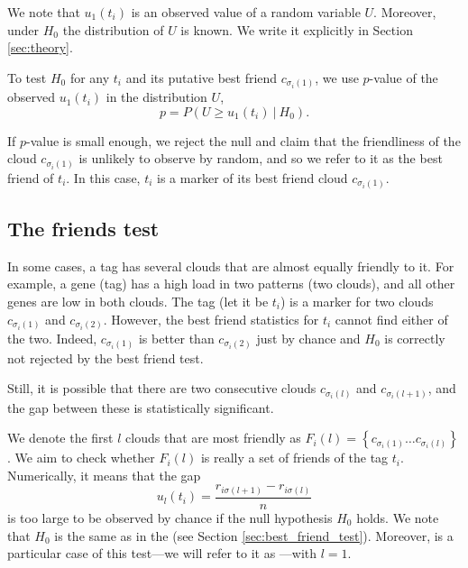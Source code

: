 \documentclass{llncs}
\begin{document}
We note that $u_1(t_i)$ is an observed value of a random variable $U$. Moreover, under $H_0$ the distribution of $U$ is known. We write it explicitly in Section \ref{sec:theory}. 

To test $H_0$ for any $t_i$ and its putative best friend $c_{\sigma_{i}(1)}$, we use $p$-value of the observed $u_1(t_i)$ in the distribution $U$,
\[
p = P\left(U \ge u_1(t_i)~|~H_0\right). 
\]


If $p$-value is small enough, we reject the null and claim that the friendliness of the cloud $c_{\sigma_{i}(1)}$ is unlikely to observe by random, and so we refer to it as the best friend of $t_i$. In this case, $t_i$ is a marker of its best friend cloud $c_{\sigma_{i}(1)}$.

\subsection{The friends test}
\label{sec:friends_test}

In some cases, a tag has several clouds that are almost equally friendly to it. 
For example, a gene (tag) has a high load in two patterns (two clouds), and all other genes are low in both clouds. The tag (let it be $t_i$) is a marker for two clouds $c_{\sigma_{i}(1)}$ and $c_{\sigma_{i}(2)}$. However, the best friend statistics for $t_i$ cannot find either of the two. 
Indeed, $c_{\sigma_{i}(1)}$ is better than $c_{\sigma_{i}(2)}$ just by chance and $H_0$ is correctly not rejected by the best friend test.

Still, it is possible that there are two consecutive clouds $c_{\sigma_i(l)}$ and $c_{\sigma_i(l+1)}$, and the gap between these is statistically significant.

We denote the first $l$ clouds that are most friendly as $F_{i}(l) = \left\{ c_{\sigma_i(1)} \dots c_{\sigma_i(l)} \right\}$.
We aim to check whether $F_{i}(l)$ is really a set of friends of the tag $t_i$. Numerically, it means that the gap 
\begin{equation}
\label{def:u_l}
u_{l}(t_i) = \frac{r_{i\sigma(l+1)} - r_{i\sigma(l)}}{n}
\end{equation}
is too large to be observed by chance if the null hypothesis $H_0$ holds. We note that $H_0$ is the same as in the  (see Section \ref{sec:best_friend_test}).
Moreover,  is a particular case of
this test---we will refer to it as ---with $l = 1$.
\end{document}
